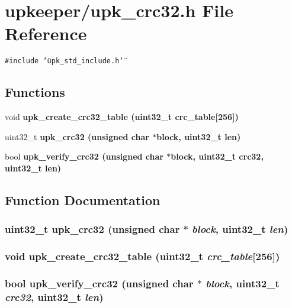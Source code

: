 \section{upkeeper/upk\_\-crc32.h File Reference}
\label{upk__crc32_8h}
{\tt \#include \char`\"{}upk\_\-std\_\-include.h\char`\"{}}\par
\subsection*{Functions}
\begin{CompactItemize}
\item 
void \bf{upk\_\-create\_\-crc32\_\-table} (uint32\_\-t crc\_\-table[256])
\item 
uint32\_\-t \bf{upk\_\-crc32} (unsigned char $\ast$block, uint32\_\-t len)
\item 
bool \bf{upk\_\-verify\_\-crc32} (unsigned char $\ast$block, uint32\_\-t crc32, uint32\_\-t len)
\end{CompactItemize}


\subsection{Function Documentation}
\subsubsection{\setlength{\rightskip}{0pt plus 5cm}uint32\_\-t upk\_\-crc32 (unsigned char $\ast$ {\em block}, uint32\_\-t {\em len})}\label{upk__crc32_8h_9f317e8418a0af4b71851819bf8ce01c}


\subsubsection{\setlength{\rightskip}{0pt plus 5cm}void upk\_\-create\_\-crc32\_\-table (uint32\_\-t {\em crc\_\-table}[256])}\label{upk__crc32_8h_2b6933bfdf4caa303dbdb7626417e01a}


\subsubsection{\setlength{\rightskip}{0pt plus 5cm}bool upk\_\-verify\_\-crc32 (unsigned char $\ast$ {\em block}, uint32\_\-t {\em crc32}, uint32\_\-t {\em len})}\label{upk__crc32_8h_135c3c60ebe008d88d6812b51a42e57f}


